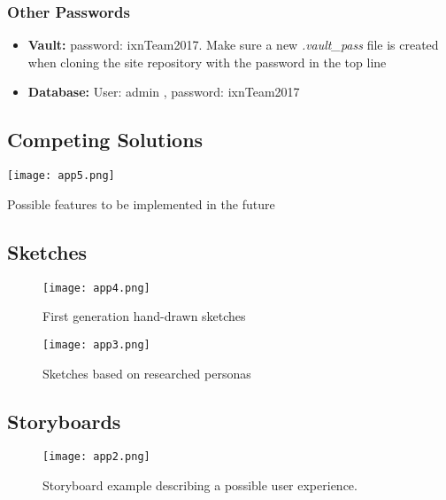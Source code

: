 \subsubsection{Other Passwords}
\begin{itemize}

  \item \textbf{Vault:} password: ixnTeam2017. Make sure a new \textit{.vault\_pass} file is created when cloning the site repository with the password in the top line
  \item \textbf{Database:} User: admin , password: ixnTeam2017

\end{itemize}

\begin{landscape}
\subsection{Competing Solutions}
  \begin{table}[H]
      \centering
      \texttt{[image: app5.png]}
      \caption{Possible features to be implemented in the future}
 \end{table}
 \end{landscape}

 \newpage


\begin{landscape}
\subsection{Sketches}
 \begin{figure}[H]
      \centering
      \texttt{[image: app4.png]}
      \caption{First generation hand-drawn sketches}
 \end{figure}
\end{landscape}

 \newpage

\begin{landscape}
 \begin{figure}[H]
      \centering
      \texttt{[image: app3.png]}
      \caption{Sketches based on researched personas}
 \end{figure}
  \end{landscape}

\newpage

\begin{landscape}
\subsection{Storyboards}
 \begin{figure}[H]
      \centering
      \texttt{[image: app2.png]}
      \caption{Storyboard example describing a possible user experience.}
 \end{figure}
\end{landscape}

